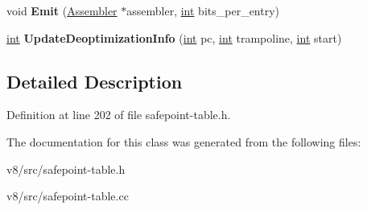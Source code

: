 \begin{DoxyCompactItemize}
void {\bfseries Emit} (\mbox{\hyperlink{classv8_1_1internal_1_1Assembler}{Assembler}} $\ast$assembler, \mbox{\hyperlink{classint}{int}} bits\+\_\+per\+\_\+entry)
\item 
\mbox{\label{classv8_1_1internal_1_1SafepointTableBuilder_a641e1b08f818fd5f9ecc67c34a4e9207}} 
\mbox{\hyperlink{classint}{int}} {\bfseries Update\+Deoptimization\+Info} (\mbox{\hyperlink{classint}{int}} pc, \mbox{\hyperlink{classint}{int}} trampoline, \mbox{\hyperlink{classint}{int}} start)
\end{DoxyCompactItemize}


\subsection{Detailed Description}


Definition at line 202 of file safepoint-\/table.\+h.



The documentation for this class was generated from the following files\+:\begin{DoxyCompactItemize}
\item 
v8/src/safepoint-\/table.\+h\item 
v8/src/safepoint-\/table.\+cc\end{DoxyCompactItemize}
